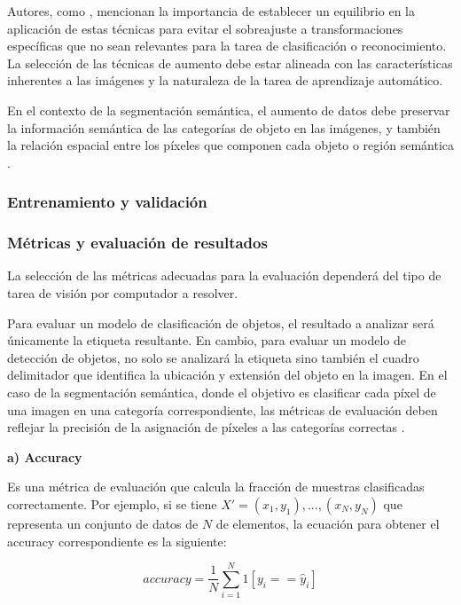 Autores, como , mencionan la importancia de establecer un equilibrio en la aplicación de estas técnicas para evitar el sobreajuste a transformaciones específicas que no sean relevantes para la tarea de clasificación o reconocimiento. La selección de las técnicas de aumento debe estar alineada con las características inherentes a las imágenes y la naturaleza de la tarea de aprendizaje automático.

En el contexto de la segmentación semántica, el aumento de datos debe preservar la información semántica de las categorías de objeto en las imágenes, y también la relación espacial entre los píxeles que componen cada objeto o región semántica \cite{aghdam2017guide}.

\subsubsection{Entrenamiento y validación}



\subsubsection{Métricas y evaluación de resultados}

La selección de las métricas adecuadas para la evaluación dependerá del tipo de tarea de visión por computador a resolver.

Para evaluar un modelo de clasificación de objetos, el resultado a analizar será únicamente la etiqueta resultante. En cambio, para evaluar un modelo de detección de objetos, no solo se analizará la etiqueta sino también el cuadro delimitador que identifica la ubicación y extensión del objeto en la imagen. En el caso de la segmentación semántica, donde el objetivo es clasificar cada píxel de una imagen en una categoría correspondiente, las métricas de evaluación deben reflejar la precisión de la asignación de píxeles a las categorías correctas \cite{patterson2017deep}.

\textbf{a) Accuracy}

Es una métrica de evaluación que calcula la fracción de muestras clasificadas correctamente. Por ejemplo, si se tiene $ {X}' = (x_{1},y_{1}), ... , (x_{N},y_{N})$ que representa un conjunto de datos de $N$ de elementos, la ecuación para obtener el accuracy correspondiente es la siguiente:

\begin{equation}
    accuracy = \frac{1}{N} \sum_{i=1}^{N} 1[y_{i} == \hat{y}_{i}]
\end{equation}

